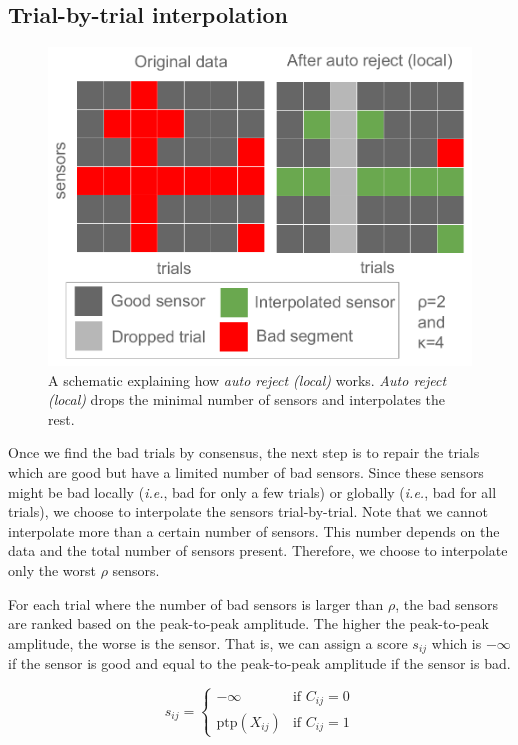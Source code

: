 \subsection{Trial-by-trial interpolation}

\begin{figure}[t]
	\begin{center}
	\includegraphics[width=0.7\linewidth]{figures/fig_xx_auto_reject_scheme.pdf}
    \end{center}
    \caption{A schematic explaining how \emph{auto reject (local)} works. \emph{Auto reject (local)} drops the minimal number of sensors and interpolates the rest.}
    \label{fig:schematic}
\end{figure}

Once we find the bad trials by consensus, the next step is to repair the trials which are good but have a limited number of bad sensors. Since these sensors might be bad locally (\textit{i.e.}, bad for only a few trials) or globally (\textit{i.e.}, bad for all trials), we choose to interpolate the sensors trial-by-trial. Note that we cannot interpolate more than a certain number of sensors. This number depends on the data and the total number of sensors present. Therefore, we choose to interpolate only the worst $\rho$ sensors.

For each trial where the number of bad sensors is larger than $\rho$, the bad sensors are ranked based on the peak-to-peak amplitude. The higher the peak-to-peak amplitude, the worse is the sensor. That is, we can assign a score $s_{ij}$ which is $-\infty$ if the sensor is good and equal to the peak-to-peak amplitude if the sensor is bad.

\begin{equation}
s_{ij} = \begin{cases}
-\infty & \text{if } C_{ij} = 0 \\
\mathrm{ptp}(X_{ij}) & \text{if } C_{ij} = 1
\end{cases}
\label{eq:score}
\end{equation}

